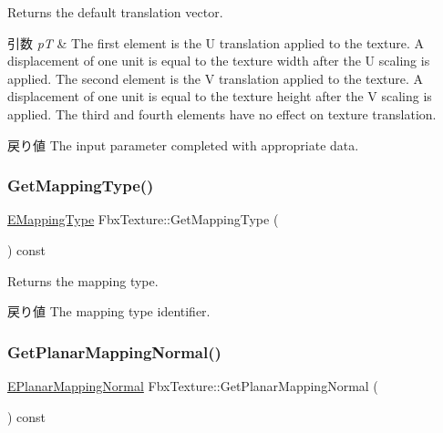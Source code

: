 Returns the default translation vector. 
\begin{DoxyParams}{引数}
{\em pT} & The first element is the U translation applied to the texture. A displacement of one unit is equal to the texture width after the U scaling is applied. The second element is the V translation applied to the texture. A displacement of one unit is equal to the texture height after the V scaling is applied. The third and fourth elements have no effect on texture translation. \\
\hline
\end{DoxyParams}
\begin{DoxyReturn}{戻り値}
The input parameter completed with appropriate data. 
\end{DoxyReturn}
\mbox{\label{class_fbx_texture_a622d8acfcb6b7ff965079294ef8d23c6}} 
\subsubsection{\texorpdfstring{Get\+Mapping\+Type()}{GetMappingType()}}
{\footnotesize\ttfamily \hyperlink{class_fbx_texture_afdf9b65a25dfe5bdcef820f0fc1f5b34}{E\+Mapping\+Type} Fbx\+Texture\+::\+Get\+Mapping\+Type (\begin{DoxyParamCaption}{ }\end{DoxyParamCaption}) const}

Returns the mapping type. \begin{DoxyReturn}{戻り値}
The mapping type identifier. 
\end{DoxyReturn}
\mbox{\label{class_fbx_texture_ad15e77afddc395d9da4ee442c769c167}} 
\subsubsection{\texorpdfstring{Get\+Planar\+Mapping\+Normal()}{GetPlanarMappingNormal()}}
{\footnotesize\ttfamily \hyperlink{class_fbx_texture_a6115b6970e4c83198112530d1e6f578c}{E\+Planar\+Mapping\+Normal} Fbx\+Texture\+::\+Get\+Planar\+Mapping\+Normal (\begin{DoxyParamCaption}{ }\end{DoxyParamCaption}) const}

